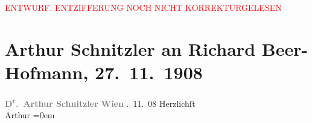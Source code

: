 
\begin{center}
            \textcolor{red}{ENTWURF. ENTZIFFERUNG NOCH NICHT KORREKTURGELESEN}
                      \end{center}
            
               \section[Arthur Schnitzler an Richard Beer-Hofmann, 27. 11. 1908]{ Arthur Schnitzler an Richard Beer-Hofmann, 27. 11. 1908}\nopagebreak{}\rehead{ }\begin{ledgroupsized}[t]{13cm}\normalsize\beginnumbering{} \toendnotes[C]{\smallbreak\pagebreak[2]} 
\pstart
           \noindent{}\centering{}{\pb}\textcolor{gray}{\textbf{D\textsuperscript{r}. Arthur Schnitzler}}\pend
           \pstart
           \noindent{}\raggedleft{}\textcolor{gray}{\textbf{Wien}}\pend
           . 11. 08\pend
           \pstart
           Herzlichſt{\\[\baselineskip]}\spacefill\mbox{Arthur}\pend
           \leftskip=0em{}\endnumbering{}\end{ledgroupsized}  \newcommand{\dateiname}{L01810}\newcommand{\titel}{Arthur Schnitzler an Richard Beer-Hofmann, 27. 11. 1908}\newcommand{\editorInnen}{Martin Anton Müller und Gerd-Hermann Susen}
      
